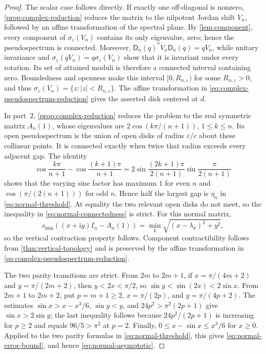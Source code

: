 \documentclass[11pt,a4paper]{article}
\numberwithin{equation}{section}
\newcommand{\ii}{\mathrm i}
\begin{document}
\begin{proof}
The scalar case follows directly.  If exactly one off-diagonal is nonzero,
\cref{prop:complex-reduction} reduces the matrix to the nilpotent Jordan
shift \(V_n\), followed by an affine transformation of the spectral plane.
By \cref{lem:component}, every
component of \(\sigma_\varepsilon(V_n)\) contains its only eigenvalue, zero;
hence the pseudospectrum is connected.  Moreover,
\(\mathsf D_n(q)^*V_n\mathsf D_n(q)=qV_n\), while unitary invariance and
\(\sigma_\varepsilon(qV_n)=q\sigma_\varepsilon(V_n)\) show that it is
invariant under every rotation.  Its
set of attained moduli is therefore a connected interval containing zero.
Boundedness and openness make this interval \([0,R_{n,\varepsilon})\) for
some \(R_{n,\varepsilon}>0\), and thus
\(\sigma_\varepsilon(V_n)=\{z:|z|<R_{n,\varepsilon}\}\).  The affine
transformation in \eqref{eq:complex-pseudospectrum-reduction} gives the
asserted disk centered at \(d\).

In part~2, \cref{prop:complex-reduction} reduces the problem to the real
symmetric matrix \(A_n(1)\), whose eigenvalues are
\(2\cos(k\pi/(n+1))\), \(1\leq k\leq n\).  Its open pseudospectrum is the
union of open disks of radius \(\varepsilon/c\) about these collinear
points.  It is connected exactly when twice that radius exceeds every
adjacent gap.  The identity
\[
 \cos\frac{k\pi}{n+1}-\cos\frac{(k+1)\pi}{n+1}
 =2\sin\frac{(2k+1)\pi}{2(n+1)}
   \sin\frac{\pi}{2(n+1)}
\]
shows that the varying sine factor has maximum \(1\) for even \(n\) and
\(\cos(\pi/(2(n+1)))\) for odd \(n\).  Hence half the largest gap is
\(\eta_n\) in
\eqref{eq:normal-threshold}.  At equality the two relevant open disks do
not meet, so the inequality in \eqref{eq:normal-connectedness} is strict.
For this normal matrix,
\[
 s_{\min}((x+\ii y)I_n-A_n(1))
 =\min_k\sqrt{(x-\lambda_k)^2+y^2},
\]
so the vertical contraction property follows.  Component
contractibility follows from \cref{thm:vertical-topology} and is preserved by
the affine transformation in \eqref{eq:complex-pseudospectrum-reduction}.

The two parity transitions are strict.  From \(2m\) to
\(2m+1\), if \(x=\pi/(4m+2)\) and \(y=\pi/(2m+2)\), then
\(y<2x<\pi/2\), so \(\sin y<\sin(2x)<2\sin x\).  From \(2m+1\) to
\(2m+2\), put \(p=m+1\geq2\), \(x=\pi/(2p)\), and
\(y=\pi/(4p+2)\).  The estimates
\(\sin x>x-x^3/6\), \(\sin y<y\), and
\(24p^2>\pi^2(2p+1)\) give \(\sin x>2\sin y\); the last inequality follows
because \(24p^2/(2p+1)\) is increasing for \(p\geq2\) and equals
\(96/5>\pi^2\) at \(p=2\).
Finally, \(0\leq x-\sin x\leq x^3/6\) for \(x\geq0\).  Applied to the two
parity formulas in \eqref{eq:normal-threshold}, this gives
\eqref{eq:normal-error-bound}, and hence \eqref{eq:normal-asymptotic}.
\end{proof}
\end{document}
